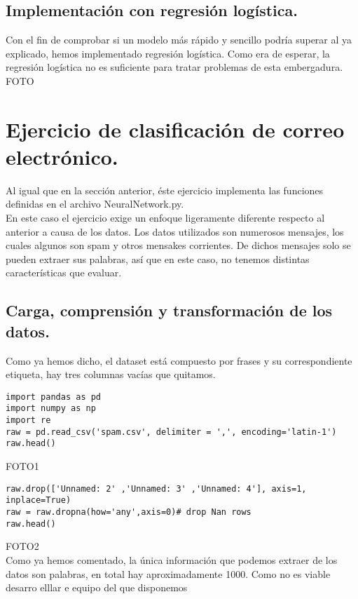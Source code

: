 \documentclass[a4paper,10pt]{article}
\begin{document}
\subsection{Implementación con regresión logística.}
Con el fin de comprobar si un modelo más rápido y sencillo podría superar al ya explicado, hemos implementado regresión logística. Como era de esperar, la regresión logística no es suficiente para tratar problemas de esta embergadura.
FOTO
\newpage
\section{Ejercicio de clasificación de correo electrónico.}
Al igual que en la sección anterior, éste ejercicio implementa las funciones definidas en el archivo NeuralNetwork.py.\\ En este caso el ejercicio exige un enfoque ligeramente diferente respecto al anterior a causa de los datos. Los datos utilizados son numerosos mensajes, los cuales algunos son spam y otros mensakes corrientes. De dichos mensajes solo se pueden extraer sus palabras, así que en este caso, no tenemos distintas características que evaluar.
\subsection{Carga, comprensión y transformación de los datos.}
Como ya hemos dicho, el dataset está compuesto por frases y su correspondiente etiqueta, hay tres columnas vacías que quitamos.
\begin{lstlisting}
import pandas as pd
import numpy as np
import re
raw = pd.read_csv('spam.csv', delimiter = ',', encoding='latin-1')
raw.head()
\end{lstlisting}
FOTO1
\begin{lstlisting}
raw.drop(['Unnamed: 2' ,'Unnamed: 3' ,'Unnamed: 4'], axis=1, inplace=True)
raw = raw.dropna(how='any',axis=0)# drop Nan rows
raw.head()
\end{lstlisting}
FOTO2\\
Como ya hemos comentado, la única información que podemos extraer de los datos son palabras, en total hay aproximadamente 1000. Como no es viable desarro elllar e equipo del que disponemos  
\end{document}
